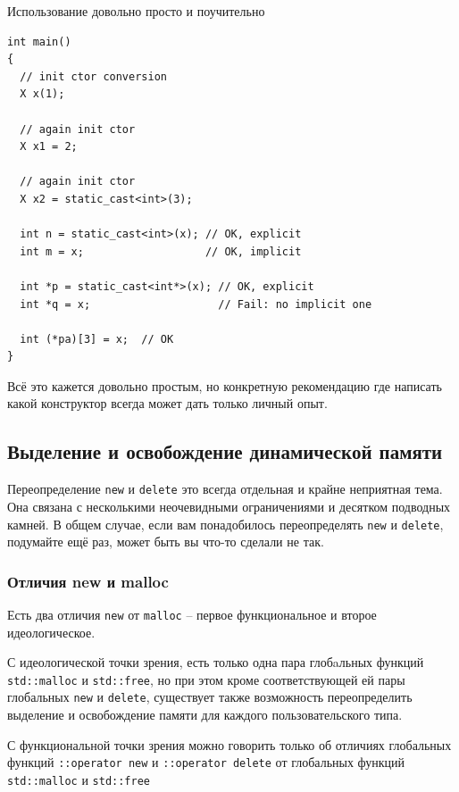 \documentclass[a4paper,12pt,oneside]{article}
\begin{document}
Использование довольно просто и поучительно

\begin{lstlisting}
int main()
{
  // init ctor conversion
  X x(1);

  // again init ctor
  X x1 = 2;

  // again init ctor
  X x2 = static_cast<int>(3);
 
  int n = static_cast<int>(x); // OK, explicit
  int m = x;                   // OK, implicit
 
  int *p = static_cast<int*>(x); // OK, explicit
  int *q = x;                    // Fail: no implicit one
 
  int (*pa)[3] = x;  // OK
}
\end{lstlisting}

Всё это кажется довольно простым, но конкретную рекомендацию где написать какой конструктор всегда может дать только личный опыт.

\pagebreak
\subsection{Выделение и освобождение динамической памяти}\label{MemManage}

Переопределение \lstinline!new! и \lstinline!delete! это всегда отдельная и крайне неприятная тема. Она связана с несколькими неочевидными ограничениями и десятком подводных камней. В общем случае, если вам понадобилось переопределять \lstinline!new! и \lstinline!delete!, подумайте ещё раз, может быть вы что-то сделали не так.

\subsubsection{Отличия new и malloc}\label{NewMalloc}

Есть два отличия \lstinline!new! от \lstinline!malloc! -- первое функциональное и второе идеологическое. 

С идеологической точки зрения, есть только одна пара глобaльных функций \lstinline!std::malloc! и \lstinline!std::free!, но при этом кроме соответствующей ей пары глобальных \lstinline!new! и \lstinline!delete!, существует также возможность переопределить выделение и освобождение памяти для каждого пользовательского типа.

С функциональной точки зрения можно говорить только об отличиях глобальных функций \lstinline!::operator new! и \lstinline!::operator delete! от глобальных функций \lstinline!std::malloc! и \lstinline!std::free!
\end{document}
